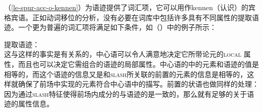 （\ref{le-spur-acc-o-kennen}）为语迹提供了词汇项，它可以用作kennen（认识）的宾格宾语。正如动词移位的分析，没有必要在词库中包括许多具有不同属性的提取语迹。一个更为普遍的词汇项将满足如下条件，如（）中的例子所示：

\eas
\label{le-extraktionsspur}
提取语迹：\\
\zs
这与这样的事实是有关系的，中心语可以令人满意地决定它所带论元的\textsc{local} 属性，而且也可以决定它需组合的语迹的局部属性。中心语的\subcatlc 中的元素和语迹的\synsemc 值是相等的，而这个语迹的信息又是和\textsc{slash}所关联的前置的元素的信息是相等的，这样就确保了前场中实现的元素符合中心语\subcatlc 中的描写。前置的状语也做同样的处理：因为通过\textsc{slash}特征使得前场内成分的\localvc 与语迹的\localvc 是一致的，那么就有足够的关于语迹的属性信息。


